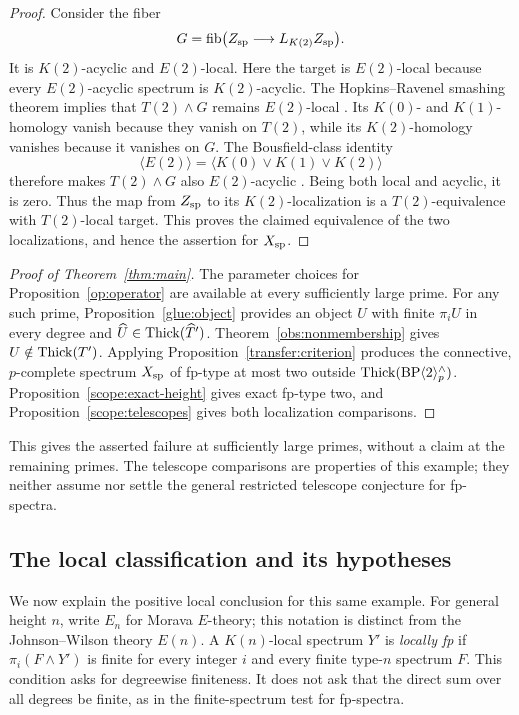 \begin{proof}
Consider the fiber
\[
 G=\operatorname{fib}\bigl(Z_{\rm sp}\longrightarrow
                    L_{K(2)}Z_{\rm sp}\bigr).
\]
It is \(K(2)\)-acyclic and \(E(2)\)-local.  Here the target is
\(E(2)\)-local because every \(E(2)\)-acyclic spectrum is
\(K(2)\)-acyclic.  The Hopkins--Ravenel smashing theorem implies
that \(T(2)\wedge G\) remains \(E(2)\)-local
\cite[Theorem~7.5.6]{Ravenel1992}.  Its \(K(0)\)- and
\(K(1)\)-homology vanish because they vanish on \(T(2)\), while its
\(K(2)\)-homology vanishes because it vanishes on \(G\).  The
Bousfield-class identity
\[
 \langle E(2)\rangle
   =\langle K(0)\vee K(1)\vee K(2)\rangle
\]
therefore makes \(T(2)\wedge G\) also \(E(2)\)-acyclic
\cite[Theorem~7.3.2(d)]{Ravenel1992}.  Being both local and acyclic,
it is zero.  Thus the map from \(Z_{\rm sp}\) to its
\(K(2)\)-localization is a \(T(2)\)-equivalence with
\(T(2)\)-local target.  This proves the claimed equivalence of the
two localizations, and hence the assertion for \(X_{\rm sp}\).
\end{proof}

\begin{proof}[Proof of Theorem~\ref{thm:main}]
The parameter choices for Proposition~\ref{op:operator} are available
at every sufficiently large prime.  For any such prime,
Proposition~\ref{glue:object} provides an object \(U\) with finite
\(\pi_iU\) in every degree and
\(\widehat U\in\operatorname{Thick}(\widehat T')\).
Theorem~\ref{obs:nonmembership} gives
\(U\notin\operatorname{Thick}(T')\).  Applying
Proposition~\ref{transfer:criterion} produces the connective,
\(p\)-complete spectrum \(X_{\rm sp}\) of fp-type at most two
outside \(\operatorname{Thick}(\mathrm{BP}\langle2\rangle_p^\wedge)\).
Proposition~\ref{scope:exact-height} gives exact fp-type two, and
Proposition~\ref{scope:telescopes} gives both localization
comparisons.
\end{proof}

This gives the asserted failure at sufficiently large primes, without
a claim at the remaining primes.  The telescope comparisons are
properties of this example; they neither assume nor settle the general
restricted telescope conjecture for fp-spectra.

\subsection{The local classification and its hypotheses}

We now explain the positive local conclusion for this same example.
For general height \(n\), write \(E_n\) for Morava \(E\)-theory;
this notation is distinct from the Johnson--Wilson theory \(E(n)\).
A \(K(n)\)-local spectrum \(Y'\) is \emph{locally fp} if
\(\pi_i(F\wedge Y')\) is finite for every integer \(i\) and every
finite type-\(n\) spectrum \(F\).  This condition asks for
degreewise finiteness.  It does not ask that the direct sum over all
degrees be finite, as in the finite-spectrum test for fp-spectra.

